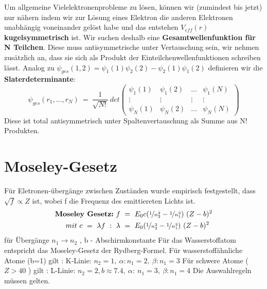 \documentclass[Ex4_Zusammenfassung.tex]{subfiles}
\begin{document}
Um allgemeine Vielelektronenprobleme zu lösen, können wir (zumindest bis jetzt) nur nähern indem wir zur Lösung eines Elektron die anderen Elektronen unabhängig voneinander gelöst habe und das entstehen $ V_{eff}(r) $ \textbf{kugelsymmetrisch} ist. \newline
Wir suchen deshalb eine  \textbf{Gesamtwellenfunktion für N Teilchen}. \newline
Diese muss antisymmetrische unter Vertauschung sein, wir nehmen zusätzlich an, dass sie sich als Produkt der Einteilchenwellenfunktionen schreiben lässt. \newline 
Analog zu $ \psi_{ges}(1,2) = \psi_1(1) \psi_2(2) - \psi_2(1) \psi_1(2) $  definieren wir die \\ \textbf{Slaterdeterminante}: 
	\begin{equation}
	  \psi_{ges}(r_1,...,r_N) \ = \  \frac{1}{\sqrt{N!}} \  det \begin{pmatrix} \psi_1(1) & \psi_1(2) & \dots & \psi_1(N) \\ \vdots & \vdots & \vdots & \vdots \\  \psi_N(1) & \psi_N(2) & \dots & \psi_N(N)  \end{pmatrix} 
	\end{equation}
Diese ist total antisymmetrisch unter Spaltenvertauschung als Summe aus N! Produkten. 
\section{Moseley-Gesetz}
Für Eletronen-übergänge zwischen Zuständen wurde empirisch festgestellt, dass $ \sqrt{f} \propto Z $ ist, wobei f die Frequenz des emittiereten Lichts ist. 
\begin{align*}
\textbf{Moseley Gesetz:} \ f \ &= \ E_0 c (\nicefrac{1}{n_2^2} - \nicefrac{1}{n_1^2}) \ (Z-b)^2 \\ 
mit \  c \  = \    \lambda f \ :   \	\lambda \ & = \ E_0 (\nicefrac{1}{n_2^2} - \nicefrac{1}{n_1^2}) \ (Z-b)^2
\end{align*}
für Übergänge $ n_1 \rightarrow n_2 $ , b - Abschirmkonstante \newline
Für das Wasserstoffatom entspricht das Moseley-Gesetz der Rydberg-Formel. \newline
Für wasserstoffähnliche Atome (b=1) gilt : \quad K-Linie: $ n_2 = 1, \  \alpha :  n_1 = 2, \  \beta: n_1 = 3 $ \newline
Für schwere Atome ($ Z > 40 $  )  gilt :  \qquad L-Linie: $ n_2 = 2 , b \approx 7.4 , \ \alpha : \ n_1= 3 , \  \beta: n_1 = 4 $ \newline
Die Auswahlregeln müssen gelten. \newline
\end{document}

